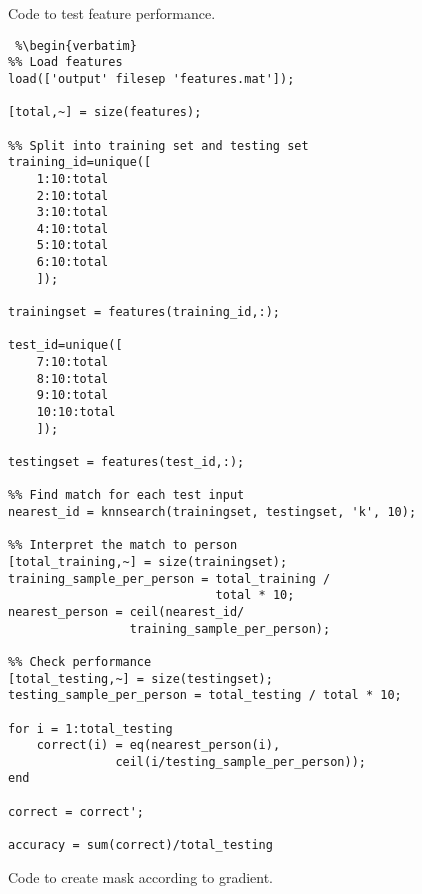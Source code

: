 Code to test feature performance.

\begin{lstlisting} %\begin{verbatim}
%% Load features
load(['output' filesep 'features.mat']);

[total,~] = size(features);

%% Split into training set and testing set
training_id=unique([
    1:10:total
    2:10:total
    3:10:total
    4:10:total
    5:10:total
    6:10:total
    ]);

trainingset = features(training_id,:);

test_id=unique([
    7:10:total
    8:10:total
    9:10:total
    10:10:total
    ]);

testingset = features(test_id,:);

%% Find match for each test input
nearest_id = knnsearch(trainingset, testingset, 'k', 10);

%% Interpret the match to person
[total_training,~] = size(trainingset);
training_sample_per_person = total_training /
                             total * 10;
nearest_person = ceil(nearest_id/
                 training_sample_per_person);

%% Check performance
[total_testing,~] = size(testingset);
testing_sample_per_person = total_testing / total * 10;

for i = 1:total_testing
    correct(i) = eq(nearest_person(i),
               ceil(i/testing_sample_per_person));
end

correct = correct';

accuracy = sum(correct)/total_testing
\end{lstlisting} %
\clearpage

Code to create mask according to gradient.

